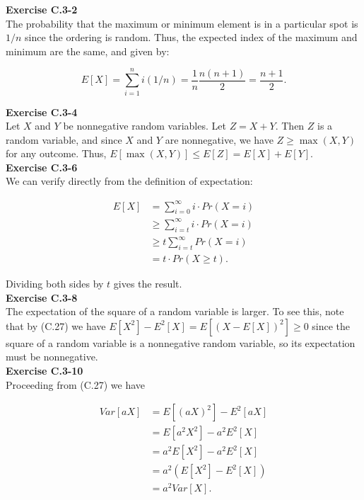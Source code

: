 \documentclass{article}
\begin{document}
\noindent\textbf{Exercise C.3-2}\\

The probability that the maximum or minimum element is in a particular spot is $1/n$ since the ordering is random.  Thus, the expected index of the maximum and minimum are the same, and given by:

\[ E[X] = \sum_{i=1}^n i(1/n) = \frac{1}{n} \frac{n(n+1)}{2} = \frac{n+1}{2}.\]

\noindent\textbf{Exercise C.3-4}\\

Let $X$ and $Y$ be nonnegative random variables.  Let $Z = X+Y$.  Then $Z$ is a random variable, and since $X$ and $Y$ are nonnegative, we have $Z \geq \max(X,Y)$ for any outcome.  Thus, $E[\max(X,Y)] \leq E[Z] = E[X] + E[Y]$.\\


\noindent\textbf{Exercise C.3-6}\\

We can verify directly from the definition of expectation:

\begin{align*}
E[X] &= \sum_{i=0}^\infty i \cdot Pr(X = i) \\
& \geq \sum_{i=t}^\infty i \cdot Pr(X=i) \\
&\geq t\sum_{i=t}^\infty Pr(X=i) \\
&= t\cdot Pr(X \geq t).
\end{align*}

Dividing both sides by $t$ gives the result. \\

\noindent\textbf{Exercise C.3-8}\\

The expectation of the square of a random variable is larger.  To see this, note that by (C.27) we have $E[X^2] - E^2[X] = E[(X-E[X])^2] \geq 0$ since the square of a random variable is a nonnegative random variable, so its expectation must be nonnegative. \\

\noindent\textbf{Exercise C.3-10}\\

Proceeding from (C.27) we have

\begin{align*}
Var[aX] &= E[(aX)^2] - E^2[aX] \\
&= E[a^2X^2] - a^2E^2[X] \\
&= a^2E[X^2] - a^2E^2[X]\\
&=a^2(E[X^2] - E^2[X])\\
&= a^2Var[X].
\end{align*}
\end{document}
